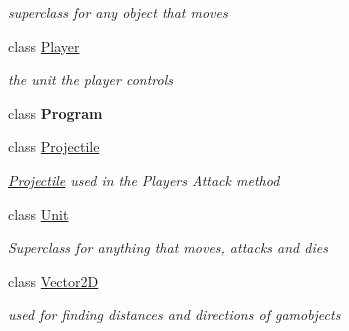 \begin{DoxyCompactItemize}
\begin{DoxyCompactList}\small\item\em superclass for any object that moves \end{DoxyCompactList}\item 
class \hyperlink{class_mage_twinstick_1_1_player}{Player}
\begin{DoxyCompactList}\small\item\em the unit the player controls \end{DoxyCompactList}\item 
class {\bfseries Program}
\item 
class \hyperlink{class_mage_twinstick_1_1_projectile}{Projectile}
\begin{DoxyCompactList}\small\item\em \hyperlink{class_mage_twinstick_1_1_projectile}{Projectile} used in the Players Attack method \end{DoxyCompactList}\item 
class \hyperlink{class_mage_twinstick_1_1_unit}{Unit}
\begin{DoxyCompactList}\small\item\em Superclass for anything that moves, attacks and dies \end{DoxyCompactList}\item 
class \hyperlink{class_mage_twinstick_1_1_vector2_d}{Vector2\+D}
\begin{DoxyCompactList}\small\item\em used for finding distances and directions of gamobjects \end{DoxyCompactList}\end{DoxyCompactItemize}
